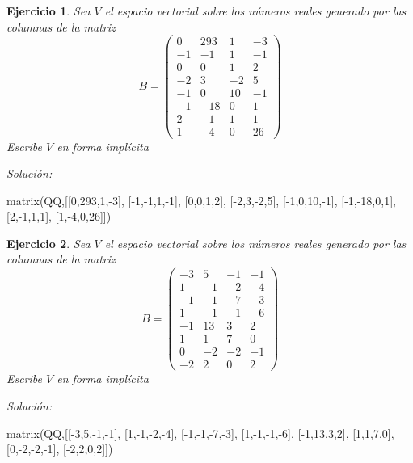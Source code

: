 \documentclass{amsart}
\newtheorem{ejer}{Ejercicio}
\begin{document}


\begin{ejer} Sea $V$ el espacio vectorial sobre los números reales 
generado por las columnas de la matriz 
\[B = \left(\begin{array}{rrrr}
0 & 293 & 1 & -3 \\
-1 & -1 & 1 & -1 \\
0 & 0 & 1 & 2 \\
-2 & 3 & -2 & 5 \\
-1 & 0 & 10 & -1 \\
-1 & -18 & 0 & 1 \\
2 & -1 & 1 & 1 \\
1 & -4 & 0 & 26
\end{array}\right)\]
Escribe $V$ en forma impl\'icita 
\end{ejer}

{\it Soluci\'on:}

\begin{sageblock}
matrix(QQ,[[0,293,1,-3],
[-1,-1,1,-1],
[0,0,1,2],
[-2,3,-2,5],
[-1,0,10,-1],
[-1,-18,0,1],
[2,-1,1,1],
[1,-4,0,26]])
\end{sageblock}



\begin{ejer} Sea $V$ el espacio vectorial sobre los números reales 
generado por las columnas de la matriz 
\[B = \left(\begin{array}{rrrr}
-3 & 5 & -1 & -1 \\
1 & -1 & -2 & -4 \\
-1 & -1 & -7 & -3 \\
1 & -1 & -1 & -6 \\
-1 & 13 & 3 & 2 \\
1 & 1 & 7 & 0 \\
0 & -2 & -2 & -1 \\
-2 & 2 & 0 & 2
\end{array}\right)\]
Escribe $V$ en forma impl\'icita 
\end{ejer}

{\it Soluci\'on:}

\begin{sageblock}
matrix(QQ,[[-3,5,-1,-1],
[1,-1,-2,-4],
[-1,-1,-7,-3],
[1,-1,-1,-6],
[-1,13,3,2],
[1,1,7,0],
[0,-2,-2,-1],
[-2,2,0,2]])
\end{sageblock}

\end{document}
